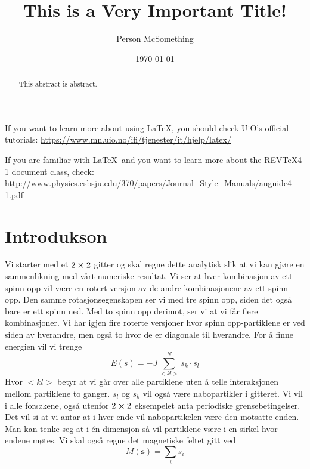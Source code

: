 \documentclass[reprint,english,notitlepage]{revtex4-1}  %
\begin{document}
\title{This is a Very Important Title!}   %
\author{Person McSomething}               %
\date{\today}                             %
\noaffiliation                            %
\begin{abstract}                          %
This abstract is abstract.                %
\end{abstract}                            %
\maketitle                                %

If you want to learn more about using \LaTeX, you should check UiO's official tutorials:
\url{https://www.mn.uio.no/ifi/tjenester/it/hjelp/latex/}

If you are familiar with \LaTeX\ and you want to learn more about the REVTeX4-1 document class, check:
\url{http://www.physics.csbsju.edu/370/papers/Journal_Style_Manuals/auguide4-1.pdf}


\section{Introdukson}



Vi starter med et $2\cross 2$ gitter og skal regne dette analytisk slik at vi kan gjøre en sammenlikning med vårt numeriske resultat. Vi ser at hver kombinasjon av ett spinn opp vil være en rotert versjon av de andre kombinasjonene av ett spinn opp. Den samme rotasjonsegenskapen ser vi med tre spinn opp, siden det også bare er ett spinn ned. Med to spinn opp derimot, ser vi at vi får flere kombinasjoner. Vi har igjen fire roterte versjoner hvor spinn opp-partiklene er ved siden av hverandre, men også to hvor de er diagonale til hverandre.
For å finne energien vil vi trenge
$$
E(s)=-J\sum_{<kl>}^N s_k \cdot s_l
$$
Hvor $<kl>$ betyr at vi går over alle partiklene uten å telle interaksjonen mellom partiklene to ganger. $s_l$ og $s_k$ vil også være nabopartikler i gitteret. Vi vil i alle forsøkene, også utenfor $2\cross 2$ eksempelet anta periodiske grensebetingelser. Det vil si at vi antar at i hver ende vil nabopartikelen være den motsatte enden. Man kan tenke seg at i én dimensjon så vil partiklene være i en sirkel hvor endene møtes.
\newline 
Vi skal også regne det magnetiske feltet gitt ved
$$
M(\mathbf{s})=\sum_i s_i
$$
\end{document}
